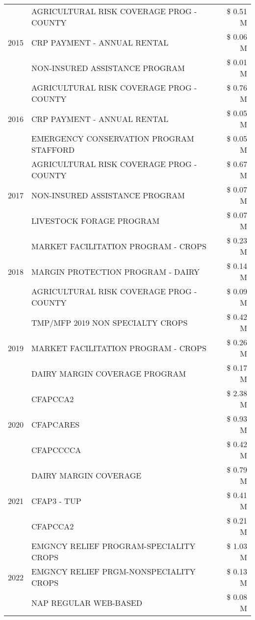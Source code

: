 \begin{tabular}{llr}
\cline{1-3}
\multirow[t]{3}{*}{2015} & AGRICULTURAL RISK COVERAGE PROG - COUNTY & \$ 0.51 M \\
 & CRP PAYMENT - ANNUAL RENTAL & \$ 0.06 M \\
 & NON-INSURED ASSISTANCE PROGRAM & \$ 0.01 M \\
\cline{1-3}
\multirow[t]{3}{*}{2016} & AGRICULTURAL RISK COVERAGE PROG - COUNTY & \$ 0.76 M \\
 & CRP PAYMENT - ANNUAL RENTAL & \$ 0.05 M \\
 & EMERGENCY CONSERVATION PROGRAM STAFFORD & \$ 0.05 M \\
\cline{1-3}
\multirow[t]{3}{*}{2017} & AGRICULTURAL RISK COVERAGE PROG - COUNTY & \$ 0.67 M \\
 & NON-INSURED ASSISTANCE PROGRAM & \$ 0.07 M \\
 & LIVESTOCK FORAGE PROGRAM & \$ 0.07 M \\
\cline{1-3}
\multirow[t]{3}{*}{2018} & MARKET FACILITATION PROGRAM - CROPS & \$ 0.23 M \\
 & MARGIN PROTECTION PROGRAM - DAIRY & \$ 0.14 M \\
 & AGRICULTURAL RISK COVERAGE PROG - COUNTY & \$ 0.09 M \\
\cline{1-3}
\multirow[t]{3}{*}{2019} & TMP/MFP 2019 NON SPECIALTY CROPS & \$ 0.42 M \\
 & MARKET FACILITATION PROGRAM - CROPS & \$ 0.26 M \\
 & DAIRY MARGIN COVERAGE PROGRAM & \$ 0.17 M \\
\cline{1-3}
\multirow[t]{3}{*}{2020} & CFAPCCA2 & \$ 2.38 M \\
 & CFAPCARES & \$ 0.93 M \\
 & CFAPCCCCA & \$ 0.42 M \\
\cline{1-3}
\multirow[t]{3}{*}{2021} & DAIRY MARGIN COVERAGE & \$ 0.79 M \\
 & CFAP3 - TUP & \$ 0.41 M \\
 & CFAPCCA2 & \$ 0.21 M \\
\cline{1-3}
\multirow[t]{3}{*}{2022} & EMGNCY RELIEF PROGRAM-SPECIALITY CROPS & \$ 1.03 M \\
 & EMGNCY RELIEF PRGM-NONSPECIALITY CROPS & \$ 0.13 M \\
 & NAP REGULAR WEB-BASED & \$ 0.08 M \\
\cline{1-3}
\bottomrule
\end{tabular}

